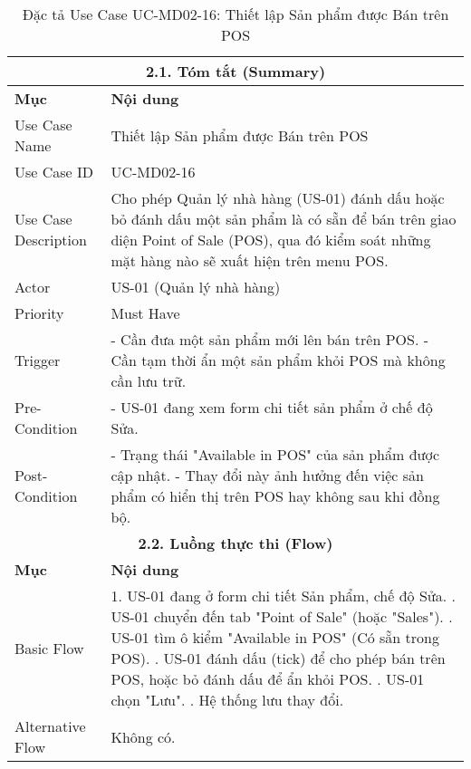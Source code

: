 \begin{longtable}{|m{4cm}|p{11cm}|}
\caption{Đặc tả Use Case UC-MD02-16: Thiết lập Sản phẩm được Bán trên POS} \label{tab:uc_md02_16_revised} \\
\hline
\multicolumn{2}{|c|}{\textbf{2.1. Tóm tắt (Summary)}} \\
\hline
\textbf{Mục} & \textbf{Nội dung} \\
\hline
\endhead %
\hline
\endfoot %
\hline
\endlastfoot %
Use Case Name & Thiết lập Sản phẩm được Bán trên POS \\
\hline
Use Case ID & UC-MD02-16 \\
\hline
Use Case Description & Cho phép Quản lý nhà hàng (US-01) đánh dấu hoặc bỏ đánh dấu một sản phẩm là có sẵn để bán trên giao diện Point of Sale (POS), qua đó kiểm soát những mặt hàng nào sẽ xuất hiện trên menu POS. \\
\hline
Actor & US-01 (Quản lý nhà hàng) \\
\hline
Priority & Must Have \\
\hline
Trigger & - Cần đưa một sản phẩm mới lên bán trên POS. \newline - Cần tạm thời ẩn một sản phẩm khỏi POS mà không cần lưu trữ. \\
\hline
Pre-Condition & - US-01 đang xem form chi tiết sản phẩm ở chế độ Sửa. \\
\hline
Post-Condition & - Trạng thái "Available in POS" của sản phẩm được cập nhật. \newline - Thay đổi này ảnh hưởng đến việc sản phẩm có hiển thị trên POS hay không sau khi đồng bộ. \\
\hline
\multicolumn{2}{|c|}{\textbf{2.2. Luồng thực thi (Flow)}} \\
\hline
\textbf{Mục} & \textbf{Nội dung} \\
\hline
Basic Flow & 1. US-01 đang ở form chi tiết Sản phẩm, chế độ Sửa. \newline 2. US-01 chuyển đến tab "Point of Sale" (hoặc "Sales"). \newline 3. US-01 tìm ô kiểm "Available in POS" (Có sẵn trong POS). \newline 4. US-01 đánh dấu (tick) để cho phép bán trên POS, hoặc bỏ đánh dấu để ẩn khỏi POS. \newline 5. US-01 chọn "Lưu". \newline 6. Hệ thống lưu thay đổi. \\
\hline
Alternative Flow & Không có. \\

\end{longtable}
